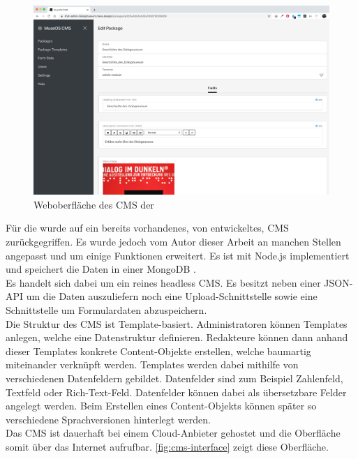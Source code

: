 \begin{figure}
    \centering
    \includegraphics[width=1\textwidth]{figures/images/cms-interface.png}
    \caption{Weboberfläche des CMS der \shst{}}
    \label{fig:cms-interface}
\end{figure}

Für die \shst{} wurde auf ein bereits vorhandenes, von \meso{} entwickeltes,
CMS zurückgegriffen. Es wurde jedoch vom Autor dieser Arbeit
an manchen Stellen angepasst und um einige Funktionen
erweitert. Es ist mit Node.js \cite{node} implementiert und speichert die Daten in einer 
MongoDB \cite{mongo}.\\
Es handelt sich dabei um ein reines headless CMS. Es besitzt neben einer JSON-API um die Daten 
auszuliefern noch eine Upload-Schnittstelle sowie eine Schnittstelle um Formulardaten abzuspeichern.\\
Die Struktur des CMS ist Template-basiert. Administratoren können Templates 
anlegen, welche eine Datenstruktur definieren. Redakteure können dann anhand dieser Templates 
konkrete Content-Objekte erstellen, welche baumartig miteinander verknüpft werden. Templates 
werden dabei mithilfe von verschiedenen Datenfeldern gebildet. Datenfelder sind zum Beispiel
Zahlenfeld, Textfeld oder Rich-Text-Feld. Datenfelder können dabei als übersetzbare Felder angelegt
werden. Beim Erstellen eines Content-Objekts können später so verschiedene Sprachversionen
hinterlegt werden.\\
Das CMS ist dauerhaft bei einem Cloud-Anbieter gehostet und die Oberfläche somit über das
Internet aufrufbar. \autoref{fig:cms-interface} zeigt diese Oberfläche.
